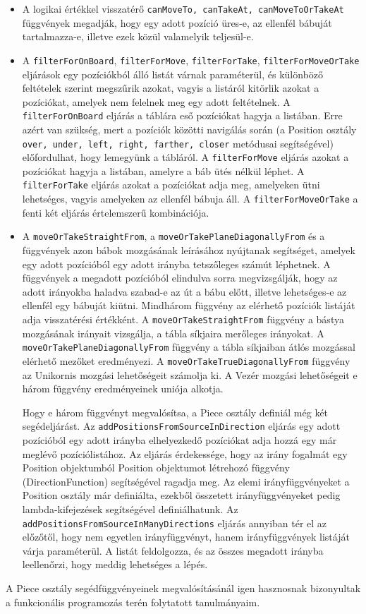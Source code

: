 \documentclass[12pt, twoside]{report}
\begin{document}
\begin{itemize}
	\item A logikai értékkel visszatérő {\tt canMoveTo, canTakeAt, canMoveToOrTakeAt} függvények megadják, hogy egy adott pozíció üres-e, az ellenfél bábuját tartalmazza-e, illetve ezek közül valamelyik teljesül-e.
	\item A {\tt filterForOnBoard}, {\tt filterForMove}, {\tt filterForTake}, {\tt filterForMoveOrTake} eljárások egy pozíciókból álló listát várnak paraméterül, és különböző feltételek szerint megszűrik azokat, vagyis a listáról kitörlik azokat a pozíciókat, amelyek nem felelnek meg egy adott feltételnek. 
		\subitem A {\tt filterForOnBoard} eljárás a táblára eső pozíciókat hagyja a listában. Erre azért van szükség, mert a pozíciók közötti navigálás során (a Position osztály {\tt over, under, left, right, farther, closer} metódusai segítségével) előfordulhat, hogy lemegyünk a tábláról. 
		\subitem A {\tt filterForMove} eljárás azokat a pozíciókat hagyja a listában, amelyre a báb ütés nélkül léphet.
		\subitem A {\tt filterForTake} eljárás azokat a pozíciókat adja meg, amelyeken ütni lehetséges, vagyis amelyeken az ellenfél bábuja áll.
		\subitem A {\tt filterForMoveOrTake} a fenti két eljárás értelemszerű kombinációja.
	\item A {\tt moveOrTakeStraightFrom}, a {\tt moveOrTakePlaneDiagonallyFrom} és a  függvények azon bábok mozgásának leírásához nyújtanak segítséget, amelyek egy adott pozícióból egy adott irányba tetszőleges számút léphetnek. A függvények a megadott pozícióból elindulva sorra megvizsgálják, hogy az adott irányokba haladva szabad-e az út a bábu előtt, illetve lehetséges-e az ellenfél egy bábuját kiütni. Mindhárom függvény az elérhető pozíciók listáját adja visszatérési értékként. A {\tt moveOrTakeStraightFrom} függvény a bástya mozgásának irányait vizsgálja, a tábla síkjaira merőleges irányokat. A {\tt moveOrTakePlaneDiagonallyFrom} függvény a tábla síkjaiban átlós mozgással elérhető mezőket eredményezi. A {\tt moveOrTakeTrueDiagonallyFrom} függvény az Unikornis mozgási lehetőségeit számolja ki. A Vezér mozgási lehetőségeit e három függvény eredményeinek uniója alkotja.
	
	Hogy e három függvényt megvalósítsa, a Piece osztály definiál még két segédeljárást.
	\subitem Az {\tt addPositionsFromSourceInDirection} eljárás egy adott pozícióból egy adott irányba elhelyezkedő pozíciókat adja hozzá egy már meglévő pozíciólistához. Az eljárás érdekessége, hogy az irány fogalmát egy Position objektumból Position objektumot létrehozó függvény (DirectionFunction) segítségével ragadja meg. Az elemi irányfüggvényeket a Position osztály már definiálta, ezekből összetett irányfüggvényeket pedig lambda-kifejezések segítségével definiálhatunk.
	\subitem Az {\tt addPositionsFromSourceInManyDirections} eljárás annyiban tér el az előzőtől, hogy nem egyetlen irányfüggvényt, hanem irányfüggvények listáját várja paraméterül. A listát feldolgozza, és az összes megadott irányba leellenőrzi, hogy meddig lehetséges a lépés.
\end{itemize}
A Piece osztály segédfüggvényeinek megvalósításánál igen hasznosnak bizonyultak a funkcionális programozás terén folytatott tanulmányaim.
\end{document}
